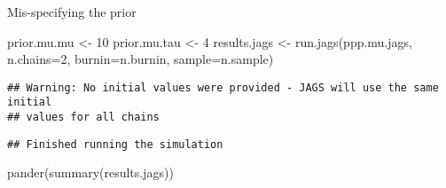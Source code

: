 \documentclass[
  ignorenonframetext,
]{beamer}
\newenvironment{Shaded}{\begin{snugshade}}{\end{snugshade}}
\newcommand{\AttributeTok}[1]{\textcolor[rgb]{0.77,0.63,0.00}{#1}}
\newcommand{\DecValTok}[1]{\textcolor[rgb]{0.00,0.00,0.81}{#1}}
\newcommand{\FunctionTok}[1]{\textcolor[rgb]{0.00,0.00,0.00}{#1}}
\newcommand{\NormalTok}[1]{#1}
\newcommand{\OtherTok}[1]{\textcolor[rgb]{0.56,0.35,0.01}{#1}}
\newcommand{\StringTok}[1]{\textcolor[rgb]{0.31,0.60,0.02}{#1}}
\begin{document}
\begin{frame}[fragile]{Mis-specifying the prior}
\protect\hypertarget{mis-specifying-the-prior}{}
\begin{Shaded}
\begin{Highlighting}[]
\NormalTok{prior.mu.mu }\OtherTok{\textless{}{-}} \DecValTok{10}
\NormalTok{prior.mu.tau }\OtherTok{\textless{}{-}} \DecValTok{4}
\NormalTok{results.jags }\OtherTok{\textless{}{-}} \FunctionTok{run.jags}\NormalTok{(}\StringTok{\textquotesingle{}ppp.mu.jags\textquotesingle{}}\NormalTok{, }\AttributeTok{n.chains=}\DecValTok{2}\NormalTok{, }\AttributeTok{burnin=}\NormalTok{n.burnin, }\AttributeTok{sample=}\NormalTok{n.sample)}
\end{Highlighting}
\end{Shaded}

\begin{verbatim}
## Warning: No initial values were provided - JAGS will use the same initial
## values for all chains
\end{verbatim}

\begin{verbatim}
## Finished running the simulation
\end{verbatim}

\begin{Shaded}
\begin{Highlighting}[]
\FunctionTok{pander}\NormalTok{(}\FunctionTok{summary}\NormalTok{(results.jags))}
\end{Highlighting}
\end{Shaded}


\end{frame}
\end{document}
